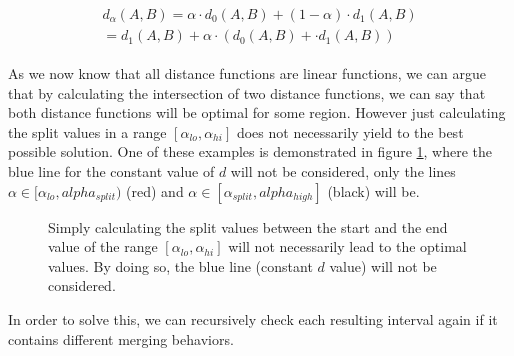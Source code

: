 \begin{equation}
    \begin{aligned}
        \begin{gathered}
        d_\alpha(A,B) = \alpha \cdot d_0(A,B) + (1-\alpha) \cdot d_1(A,B)\\
        = d_1(A,B) + \alpha \cdot (d_0(A,B) + \cdot d_1(A,B))
        \end{gathered}
    \end{aligned}
    \label{eq:linear}
\end{equation}

As we now know that all distance functions are linear functions, we can argue that by calculating the intersection of two distance functions, we can say that both distance functions will be optimal for some region. However just calculating the split values in a range $[\alpha_{lo}, \alpha_{hi}]$ does not necessarily yield to the best possible solution. One of these examples is demonstrated in figure \ref{fig:notoptimal}, where the blue line for the constant value of $d$ will not be considered, only the lines $\alpha \in [\alpha_{lo}, alpha_{split})$ (red) and $\alpha \in [\alpha_{split}, alpha_{high}]$ (black) will be.

\begin{figure}
    \centering
    \caption{Simply calculating the split values between the start and the end value of the range $[\alpha_{lo}, \alpha_{hi}]$ will not necessarily lead to the optimal values. By doing so, the blue line (constant $d$ value) will not be considered.}
    \label{fig:notoptimal}
\end{figure}

In order to solve this, we can recursively check each resulting interval again if it contains different merging behaviors.

